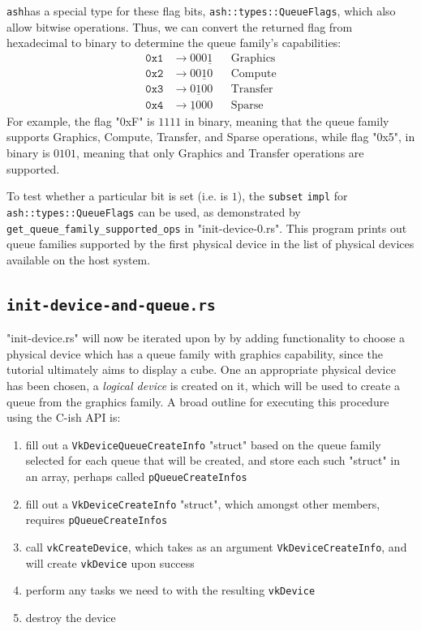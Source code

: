 \documentclass[12pt,letterpaper]{article}
\newcommand{\ril}[1]{\texttt{#1}}
\newcommand{\cil}[1]{\texttt{#1}}
\newcommand{\ash}{\texttt{ash}}
\begin{document}
	\ash has a special type for these flag bits, \ril{ash::types::QueueFlags}, which also allow bitwise operations. Thus, we can convert the returned flag from hexadecimal to binary to determine the queue family's capabilities:
    	\begin{align*}
    		\mathtt{0x1} &\rightarrow 000\underline{1} && \text{Graphics}\\
    		\mathtt{0x2} &\rightarrow 00\underline{1}0 && \text{Compute}\\
    		\mathtt{0x3} &\rightarrow 0\underline{1}00 && \text{Transfer}\\
    		\mathtt{0x4} &\rightarrow \underline{1}000 && \text{Sparse}
    	\end{align*}
     For example, the flag "0xF" is $1111$ in binary, meaning that the queue family supports Graphics, Compute, Transfer, and Sparse operations, while flag "0x5", in binary is $0101$, meaning that only Graphics and Transfer operations are supported.
         
	To test whether a particular bit is set (i.e. is $1$), the \ril{subset} \ril{impl} for \ril{ash::types::QueueFlags} can be used, as demonstrated by  \ril{get_queue_family_supported_ops} in "init-device-0.rs". This program prints out queue families supported by the first physical device in the list of physical devices available on the host system.
		
\subsection{\texttt{init-device-and-queue.rs}}
	"init-device.rs" will now be iterated upon by by adding functionality to choose a physical device which has a queue family with graphics capability, since the tutorial ultimately aims to display a cube. One an appropriate physical device has been chosen, a \emph{logical device} is created on it, which will be used to create a queue from the graphics family. A broad outline for executing this procedure using the C-ish API is:
		\begin{enumerate}
			\item fill out a \cil{VkDeviceQueueCreateInfo} "struct" based on the queue family selected for each queue that will be created, and store each such "struct" in an array, perhaps called \cil{pQueueCreateInfos}
				
			\item fill out a \cil{VkDeviceCreateInfo} "struct", which amongst other members, requires \cil{pQueueCreateInfos}
                
			\item call \cil{vkCreateDevice}, which takes as an argument \cil{VkDeviceCreateInfo}, and will create \cil{vkDevice} upon success
				
			\item perform any tasks we need to with the resulting \cil{vkDevice}
				
			\item destroy the device
		\end{enumerate}
		
\end{document}
